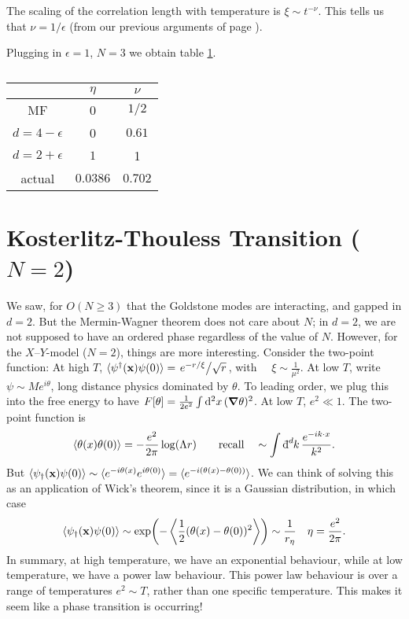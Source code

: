 The scaling of the correlation length with temperature is $\xi \sim t^{-\nu}$. This tells us that $\nu = 1 / \epsilon$ (from our previous arguments of page \pageref{64}).

Plugging in $\epsilon = 1$, $N = 3$ we obtain table \ref{tab:16-exp}.
\begin{table}[tbhp]
  \centering
  \begin{tabular}{c | c c}
    & $\eta$ & $\nu$ \\
    \hline
    MF & 0 & $1/2$ \\
    $d = 4 - \epsilon$ & 0 & $0.61$ \\
    $d = 2 + \epsilon$ & $1$ & 1 \\
    actual & $0.0386$ & $0.702$ \\
  \end{tabular}
  \caption{}
  \label{tab:16-exp}
\end{table}

\section{Kosterlitz-Thouless Transition (\texorpdfstring{$N=2$}{N = 2})}%
\label{sec:kosterlitz_thouless_transition_n_2}

We saw, for $O(N \geq 3)$ that the Goldstone modes are interacting, and gapped in $d = 2$.
But the Mermin-Wagner theorem does not care about $N$; in $d = 2$, we are not supposed to have an ordered phase regardless of the value of $N$.
However, for the $X$--$Y$-model ($N = 2$), things are more interesting.
Consider the two-point function: At high $T$, $\langle \psi^{\dagger}(\vb{x}) \psi(0) \rangle = \flatfrac{e^{- r / \xi}}{\sqrt{r}}$, with $\quad \xi \sim \frac{1}{\mu^2}$.
At low $T$, write $\psi \sim M e^{i\theta}$, long distance physics dominated by $\theta$.
To leading order, we plug this into the free energy to have $F[\theta] = \frac{1}{2e^2} \int \dd[2]{x} (\grad \theta)^2$. At low $T$, $e^2 \ll 1$.
The two-point function is
\begin{equation}
  \langle \theta(x) \theta(0) \rangle = - \frac{e^2}{2\pi} \log (\Lambda r) \qquad \text{recall} \quad \sim \int \bdd[d]{k} \frac{e^{-i k \cdot x}}{k^2}.
\end{equation}
But $\langle \psi_{\dagger}(\vb{x}) \psi(0) \rangle \sim \langle e^{-i \theta(x)} e^{i \theta(0)} \rangle = \langle e^{-i (\theta(x) - \theta(0))} \rangle$. We can think of solving this as an application of Wick's theorem, since it is a Gaussian distribution, in which case
\begin{equation}
  \langle \psi_{\dagger}(\vb{x}) \psi(0) \rangle \sim \exp(- \left\langle \frac{1}{2} (\theta(x) - \theta(0))^2 \right\rangle) \sim \frac{1}{r_{\eta}} \quad \eta = \frac{e^2}{2 \pi}.
\end{equation}
In summary, at high temperature, we have an exponential behaviour, while at low temperature, we have a power law behaviour. This power law behaviour is over a range of temperatures $e^2 \sim T$, rather than one specific temperature.
This makes it seem like a phase transition is occurring!

